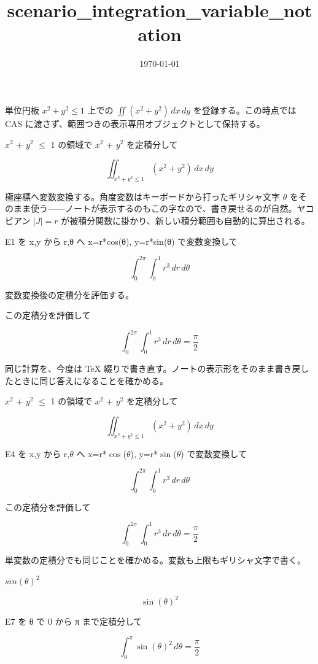 \documentclass[dvipdfmx,a4paper,11pt]{jsarticle}
\title{scenario\_integration\_variable\_notation}
\date{\today}
\begin{document}
\maketitle

単位円板 $x^2+y^2\le1$ 上での $\iint(x^2+y^2)\,dx\,dy$ を登録する。この時点では CAS に渡さず、範囲つきの表示専用オブジェクトとして保持する。

$x^2$ + $y^2$ $\le$ 1 の領域で $x^2$ + $y^2$ を定積分して

\begin{equation}
  \iint_{x^2+y^2 \le 1} (x^2 + y^2) \, dx \, dy
  \label{eq:E1}
\end{equation}

極座標へ変数変換する。角度変数はキーボードから打ったギリシャ文字 $\theta$ をそのまま使う——ノートが表示するのもこの字なので、書き戻せるのが自然。ヤコビアン $|J|=r$ が被積分関数に掛かり、新しい積分範囲も自動的に算出される。

E1 を x,y から r,θ へ x=r*cos(θ), y=r*sin(θ) で変数変換して

\begin{equation}
  \int_{0}^{2\pi} \int_{0}^{1} r^3 \, dr \, d\theta
  \label{eq:E2}
\end{equation}

変数変換後の定積分を評価する。

この定積分を評価して

\begin{equation}
  \int_{0}^{2\pi} \int_{0}^{1} r^3 \, dr \, d\theta = \frac{\pi}{2}
  \label{eq:E3}
\end{equation}

同じ計算を、今度は TeX 綴りで書き直す。ノートの表示形をそのまま書き戻したときに同じ答えになることを確かめる。

$x^2$ + $y^2$ $\le$ 1 の領域で $x^2$ + $y^2$ を定積分して

\begin{equation}
  \iint_{x^2+y^2 \le 1} (x^2 + y^2) \, dx \, dy
  \label{eq:E4}
\end{equation}

E4 を x,y から r,$\theta$ へ x=r*$\cos$($\theta$), y=r*$\sin$($\theta$) で変数変換して

\begin{equation}
  \int_{0}^{2\pi} \int_{0}^{1} r^3 \, dr \, d\theta
  \label{eq:E5}
\end{equation}

この定積分を評価して

\begin{equation}
  \int_{0}^{2\pi} \int_{0}^{1} r^3 \, dr \, d\theta = \frac{\pi}{2}
  \label{eq:E6}
\end{equation}

単変数の定積分でも同じことを確かめる。変数も上限もギリシャ文字で書く。

$sin(\theta )^2$

\begin{equation}
  \sin(\theta)^2
  \label{eq:E7}
\end{equation}

E7 を θ で 0 から π まで定積分して

\begin{equation}
  \int_{0}^{\pi} \sin(\theta)^2 \, d\theta = \frac{\pi}{2}
  \label{eq:E8}
\end{equation}
\end{document}
